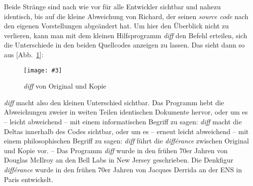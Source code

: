 \documentclass[a4paper,11pt]{article}
\newcommand{\pngbild}[4]{\texttt{[image: \#3]}}
\newcommand{\anzeige}{\textbf{\color{hokkaido}\huge{\raisebox{-0.18ex}{$\bullet$}}\color{black}}}
\begin{document}
Beide Stränge sind nach wie vor für alle Entwickler sichtbar und nahezu identisch, bis auf die kleine Abweichung von {\color{dzug}Richard}, der seinen \emph{source code} nach den eigenen Vorstellungen abgeändert hat. Um hier den Überblick nicht zu verlieren, kann man mit dem kleinen Hilfsprogramm \emph{diff} den Befehl erteilen, sich die Unterschiede in den beiden Quellcodes anzeigen zu lassen. Das sieht dann so aus [\anzeige Abb.~\ref{abb:orikopie}]: 


\begin{figure}[ht]
\begin{center}
\pngbild{433}{176}{../bilder/Abb-2.png}{1.1\textwidth}\\[-3mm]
\caption{\emph{diff} von Original und Kopie}\label{abb:orikopie}
\end{center}
\end{figure}

\enlargethispage{6mm}

\emph{diff} macht also den kleinen Unterschied sichtbar. Das Programm hebt die Abweichungen zweier in weiten Teilen identischen Dokumente hervor, oder um es – leicht abweichend – mit einem informatischen Begriff zu sagen: \emph{diff} macht die Deltas innerhalb des Codes sichtbar, oder um es – erneut leicht abweichend – mit einem philosophischen Begriff zu sagen: \emph{diff} führt die \emph{différance} zwischen Original und Kopie vor. – Das Programm \emph{diff} wurde in den frühen 70er Jahren von Douglas McIlroy an den Bell Labs in New Jersey geschrieben. Die Denkfigur \emph{différance} wurde in den frühen 70er Jahren von Jacques Derrida an der ENS in Paris entwickelt. 
\end{document}

